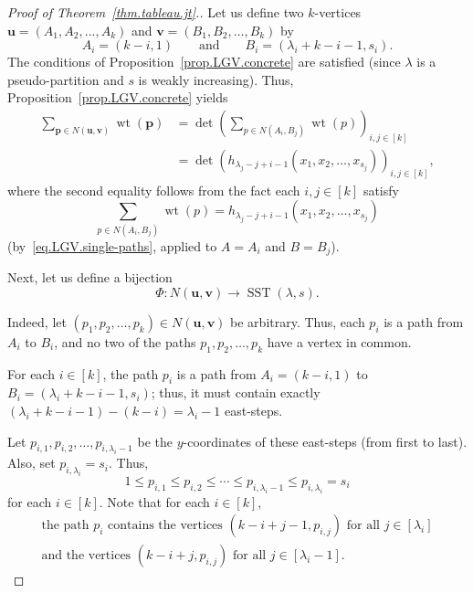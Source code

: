 \documentclass[reqno]{amsart}
\newcommand{\0}{\phantom{c}}
\DeclareMathOperator{\wt}{wt} %
\DeclareMathOperator{\SST}{SST} %
\newcommand{\pp}{\mathbf{p}}
\newcommand{\uu}{\mathbf{u}}
\newcommand{\vv}{\mathbf{v}}
\let\sumnonlimits\sum
\renewcommand{\sum}{\sumnonlimits\limits}
\newenvironment{verlong}{}{}
\newcommand{\tup}[1]{\left( #1 \right)}
\newcommand{\ive}[1]{\left[ #1 \right]}
\theoremstyle{plain}
\theoremstyle{definition}
\numberwithin{equation}{section}
\begin{document}
\begin{verlong}
\begin{proof}[Proof of Theorem~\ref{thm.tableau.jt}.]
Let us define two $k$-vertices $\uu = \tup{A_1, A_2, \dotsc, A_k}$ and $\vv = \tup{B_1, B_2, \dotsc, B_k}$ by
\[
A_i = (k-i,1)  \qquad \text{and} \qquad B_i = (\lambda_i+k-i-1, s_i).
\]
The conditions of Proposition~\ref{prop.LGV.concrete} are satisfied (since $\lambda$ is a pseudo-partition and $s$ is weakly increasing).
Thus, Proposition~\ref{prop.LGV.concrete} yields
\begin{equation}
\label{pf.thm.tableau.jt.1}
\begin{split}
\sum_{\pp \in N(\uu,\vv)} \wt(\pp) & = \det\left(  \sum_{p \in  N(A_i,B_j)}\wt(p) \right)_{i, j \in \ive{k}} \\
& = \det\left( h_{\lambda_j-j+i-1}(x_1, x_2, \dotsc, x_{s_j}) \right)_{i, j \in \ive{k}},
\end{split}
\end{equation}
where the second equality follows from the fact each $i,j \in \ive{k}$ satisfy
\[
\sum_{p \in N(A_i,B_j)} \wt(p) = h_{\lambda_j-j+i-1}(x_1, x_2, \dotsc, x_{s_j})
\]
(by~\eqref{eq.LGV.single-paths}, applied to $A = A_i$ and $B = B_j$).

Next, let us define a bijection
\[
\Phi \colon N(\uu, \vv) \to \SST(\lambda, s).
\]

Indeed, let $\tup{p_1, p_2, \dotsc, p_k} \in N(\uu,\vv)$ be arbitrary.
Thus, each $p_i$ is a path from $A_i$ to $B_i$, and no two of the paths $p_1, p_2, \dotsc, p_k$ have a vertex in common.

For each $i \in \ive{k}$, the path $p_i$ is a path from $A_i = (k-i, 1)$ to $B_i = (\lambda_i+k-i-1,s_i)$; thus, it must contain exactly $(\lambda_i+k-i-1) - (k-i) = \lambda_i - 1$ east-steps.

Let $p_{i,1},p_{i,2}, \dotsc, p_{i,\lambda_i-1}$ be the $y$-coordinates of these east-steps (from first to last).
Also, set $p_{i,\lambda_i} = s_i$.
Thus,
\begin{equation}
\label{pf.thm.tableau.jt.row-weak}
1 \leq p_{i,1} \leq p_{i,2} \leq \cdots \leq p_{i,\lambda_i-1} \leq p_{i,\lambda_i} = s_i
\end{equation}
for each $i \in \ive{k}$.
Note that for each $i \in \ive{k}$,
\begin{subequations}
\begin{gather}
\label{pf.thm.tableau.jt.pi-vert-1}
\text{the path }p_i\text{ contains the vertices } (k-i+j-1, p_{i,j})  \text{ for all } j \in \ive{\lambda_i}
\\
\label{pf.thm.tableau.jt.pi-vert-2}
\text{and the vertices } (k-i+j, p_{i,j}) \text{ for all } j \in \ive{\lambda_i-1}.
\end{gather}
\end{subequations}


\end{proof}
\end{verlong}
\end{document}
